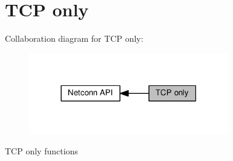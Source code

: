 \hypertarget{group__netconn__tcp}{}\section{T\+CP only}
\label{group__netconn__tcp}
Collaboration diagram for T\+CP only\+:
\nopagebreak
\begin{figure}[H]
\begin{center}
\leavevmode
\includegraphics[width=247pt]{group__netconn__tcp}
\end{center}
\end{figure}
T\+CP only functions 